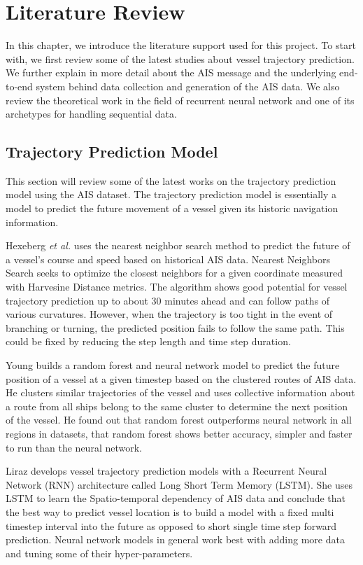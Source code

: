 \chapter{Literature Review}
\label{ch:review}
\vspace{2em}

In this chapter, we introduce the literature support used for this project. To start with, we first review some of the latest studies about vessel trajectory prediction. We further explain in more detail about the AIS message and the underlying end-to-end system behind data collection and generation of the AIS data. We also review the theoretical work in the field of recurrent neural network and one of its archetypes for handling sequential data.

\section{Trajectory Prediction Model}
This section will review some of the latest works on the trajectory prediction model using the AIS dataset. The trajectory prediction model is essentially a model to predict the future movement of a vessel given its historic navigation information.

Hexeberg \emph{et al.} \cite{hexeberg2017ais} uses the nearest neighbor search method to predict the future of a vessel's course and speed based on historical AIS data. Nearest Neighbors Search seeks to optimize the closest neighbors for a given coordinate measured with Harvesine Distance metrics. The algorithm shows good potential for vessel trajectory prediction up to about 30 minutes ahead and can follow paths of various curvatures. However, when the trajectory is too tight in the event of branching or turning, the predicted position fails to follow the same path. This could be fixed by reducing the step length and time step duration.

Young \cite{young2017predicting} builds a random forest and neural network model to predict the future position of a vessel at a given timestep based on the clustered routes of AIS data. He clusters similar trajectories of the vessel and uses collective information about a route from all ships belong to the same cluster to determine the next position of the vessel. He found out that random forest outperforms neural network in all regions in datasets, that random forest shows better accuracy, simpler and faster to run than the neural network.

Liraz \cite{liraz2018ships} develops vessel trajectory prediction models with a Recurrent Neural Network (RNN) architecture called Long Short Term Memory (LSTM). She uses LSTM to learn the Spatio-temporal dependency of AIS data and conclude that the best way to predict vessel location is to build a model with a fixed multi timestep interval into the future as opposed to short single time step forward prediction. Neural network models in general work best with adding more data and tuning some of their hyper-parameters.

